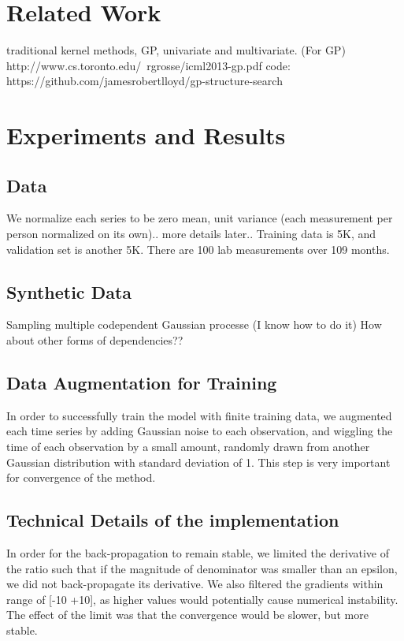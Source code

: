 \documentclass{article} %
\begin{document}
\section{Related Work}
traditional kernel methods, GP, univariate and multivariate.
(For GP)
http://www.cs.toronto.edu/~rgrosse/icml2013-gp.pdf
code: https://github.com/jamesrobertlloyd/gp-structure-search


\section{Experiments and Results}
\subsection{Data}
We normalize each series to be zero mean, unit variance (each measurement per person normalized on its own).. more details later..
Training data is 5K, and validation set is another 5K. There are 100 lab measurements over 109 months. 

\subsection{Synthetic Data}
Sampling multiple codependent Gaussian processe (I know how to do it)
How about other forms of dependencies??

\subsection{Data Augmentation for Training}
In order to successfully train the model with finite training data, we augmented each time series by adding Gaussian noise to each observation, and wiggling the time of each observation by a small amount, randomly drawn from another Gaussian distribution with standard deviation of 1. This step is very important for convergence of the method. 

\subsection{Technical Details of the implementation}
In order for the back-propagation to remain stable, we limited the derivative of the ratio such that if the magnitude of denominator was smaller than an epsilon, we did not back-propagate its derivative. We also filtered the gradients within range of [-10 +10], as higher values would potentially cause numerical instability. The effect of the limit was that the convergence would be slower, but more stable.
\end{document}
